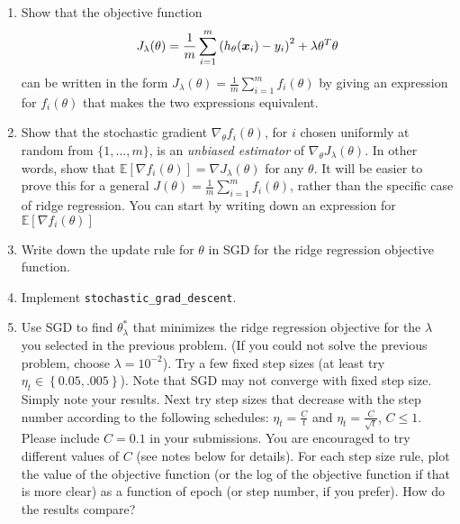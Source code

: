 \documentclass{article}
\begin{document}
\begin{enumerate}
\setcounter{enumi}{\value{saveenum}}
\item Show that the objective function 
\[
J_{\lambda}(\theta)=\frac{1}{m}\sum_{i=1}^{m}\left(h_{\theta}(\boldsymbol{x}_{i})-y_{i}\right)^{2}+\lambda\theta^{T}\theta
\]
can be written in the form $J_\lambda(\theta)=\frac{1}{m}\sum_{i=1}^{m}f_{i}(\theta)$
by giving an expression for $f_{i}(\theta)$ that makes the two expressions
equivalent.

\item Show that the stochastic gradient $\nabla_\theta f_{i}(\theta)$, for $i$
chosen uniformly at random from $\{1,\ldots,m\}$, is an \emph{unbiased estimator} of $\nabla_\theta J_\lambda(\theta)$. In other words, show that $\mathbb{E}\left[\nabla f_{i}(\theta)\right]=\nabla J_\lambda(\theta)$
for any $\theta$. It will be easier to prove
this for a general $J(\theta)=\frac{1}{m}\sum_{i=1}^{m}f_{i}(\theta)$,
rather than the specific case of ridge regression. You can start by
writing down an expression for $\mathbb{E}\left[\nabla f_{i}(\theta)\right]$
\item Write down the update rule for $\theta$ in SGD for the ridge
regression objective function.
\item Implement \texttt{stochastic\_grad\_descent}. 

\item Use SGD to find $\theta_{\lambda}^{*}$ that minimizes the ridge regression
objective for the $\lambda$ you selected in the previous
problem. (If you could not solve the previous problem, choose $\lambda=10^{-2}$). Try a few fixed step sizes (at least try $\eta_{t}\in\left\{ 0.05,.005\right\} $).
Note that SGD may not converge with fixed step size. Simply note your
results. Next try step sizes that decrease with the step number according
to the following schedules: $\eta_{t}=\frac{C}{t}$ and $\eta_{t}=\frac{C}{\sqrt{t}}$, $C \leq 1$. Please include $C = 0.1$ in your submissions. You are encouraged to try different values of $C$ (see notes below for details).
For each step size rule, plot the value of the objective function
(or the log of the objective function if that is more clear) as a
function of epoch (or step number, if you prefer). How do the results compare?

\setcounter{saveenum}{\value{enumi}}
\end{enumerate}
\end{document}
